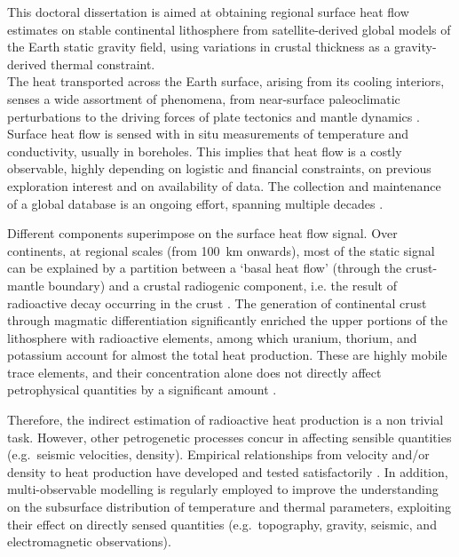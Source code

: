 This doctoral dissertation is aimed at obtaining regional surface heat flow estimates on stable continental lithosphere from satellite-derived global models of the Earth static gravity field, using variations in crustal thickness as a gravity-derived thermal constraint.
\\

The heat transported across the Earth surface, arising from its cooling interiors, senses a wide assortment of phenomena, from near-surface paleoclimatic perturbations \parencite{Majorowicz2011} to the driving forces of plate tectonics and mantle dynamics \parencite{Cooper2017}.
Surface heat flow is sensed with in situ measurements of temperature and conductivity, usually in boreholes.
This implies that heat flow is a costly observable, highly depending on logistic and financial constraints, on previous exploration interest and on availability of data.
The collection and maintenance of a global database is an ongoing effort, spanning multiple decades \parencites{Lee1965}{Hasterok2008}.

Different components superimpose on the surface heat flow signal.
Over continents, at regional scales (from \SI{100}{\kilo \metre} onwards), most of the static signal can be explained by a partition between a `basal heat flow' (through the crust-mantle boundary) and a crustal radiogenic component, i.e. the result of radioactive decay occurring in the crust \parencite{Jaupart2016}.
The generation of continental crust through magmatic differentiation significantly enriched the upper portions of the lithosphere with radioactive elements, among which uranium, thorium, and potassium account for almost the total heat production.
These are highly mobile trace elements, and their concentration alone does not directly affect petrophysical quantities by a significant amount \parencite{Hasterok2017_mis}.

Therefore, the indirect estimation of radioactive heat production is a non trivial task.
However, other petrogenetic processes concur in affecting sensible quantities (e.g.~seismic velocities, density).
Empirical relationships from velocity and/or density to heat production have developed and tested satisfactorily \parencites{Rudnick2003}{Vila2010}{Hasterok2017_ign}.
In addition, multi-observable modelling \parencites[e.g.][]{Mather2018}{Afonso2019} is regularly employed to improve the understanding on the subsurface distribution of temperature and thermal parameters, exploiting their effect on directly sensed quantities (e.g.~topography, gravity, seismic, and electromagnetic observations).
\\

